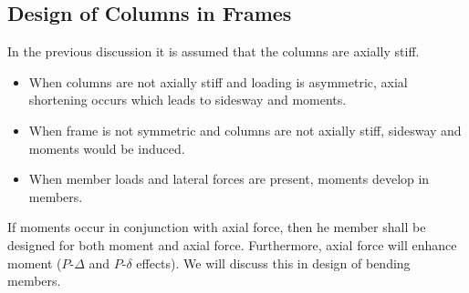 \subsection{Design of Columns in Frames}
In the previous discussion it is assumed that the columns are axially stiff.
\begin{itemize}
\item When columns are not axially stiff and loading is asymmetric, axial shortening occurs which leads to sidesway and moments.
\item When frame is not symmetric and columns are not axially stiff, sidesway and moments would be induced.
\item When member loads and lateral forces are present, moments develop in members.
\end{itemize}
\begin{figure}[H]
\centering
\end{figure}
If moments occur in conjunction with axial force, then he member shall be designed for both moment and axial force. Furthermore, axial force will enhance moment ($P$-$\Delta$ and $P$-$\delta$ effects). We will discuss this in design of bending members.
